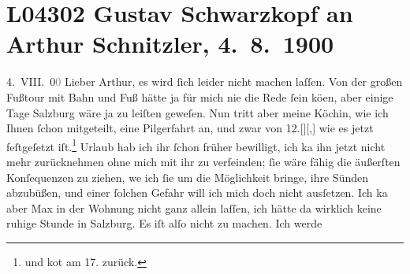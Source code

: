

\section[Gustav Schwarzkopf an Arthur Schnitzler, 4. 8. 1900]{L04302 Gustav Schwarzkopf an Arthur Schnitzler, 4. 8. 1900}
\nopagebreak{}
\rehead{ }\normalsize\beginnumbering{}
\toendnotes[C]{\smallbreak\pagebreak[2]}
\toendnotes[C]{\smallbreak}
\toendnotes[C]{\smallbreak}
\pstart
           \raggedleft{}{\pb}4. VIII. 0\textcolor{gray}{0}\pend
           \vspace{0.5em}
\pstart
           Lieber Arthur, es wird{ }ſich leider nicht machen laſſen. Von der
               großen Fußtour mit Bahn und Fuß hätte ja für mich nie die Rede{ }ſein kö{\geminationn}en, aber einige Tage Salzburg wäre ja zu leiſten geweſen. Nun tritt aber meine Köchin, wie ich Ihnen{ }ſchon mitgeteilt, eine
               Pilgerfahrt an, und zwar von 12.{[}{]}{[},{]} wie es jetzt feſtgeſetzt iſt.\footnote{\noindent{}und ko{\geminationm}t am 17. zurück.} Urlaub hab ich ihr{ }ſchon früher bewilligt, ich ka{\geminationn} ihn jetzt nicht mehr zurücknehmen ohne mich mit ihr zu verfeinden;{ }ſie wäre fähig
               die äußerſten Konſequenzen zu ziehen, we{\geminationn} ich{ }ſie um die
               Möglichkeit {\pb}bringe, ihre Sünden
               abzubüßen, und einer{ }ſolchen Gefahr will ich mich doch nicht ausſetzen. Ich ka{\geminationn} aber Max in der
               Wohnung nicht ganz allein laſſen,
               ich hätte da{\geminationn} wirklich keine ruhige Stunde in Salzburg. Es iſt alſo nicht zu machen. Ich werde
